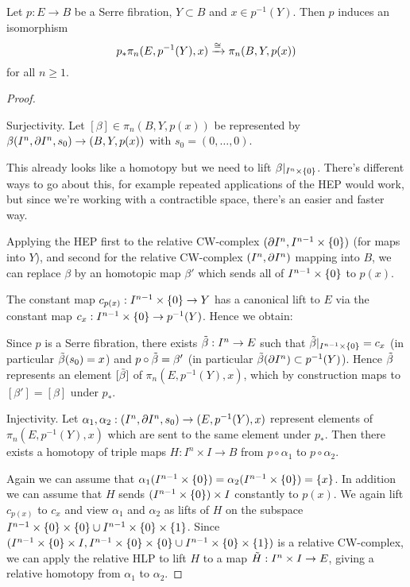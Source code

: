 \begin{proposition}
Let $p:E\to B$ be a Serre fibration, $Y\subset B$ and $x\in p^{-1}(Y)$. Then $p$ induces an isomorphism
\[p_*\pi_n(E,p^{-1}(Y),x)\xrightarrow{\cong}\pi_n(B,Y,p(x))\]
for all $n\geq1$.
\end{proposition}

\begin{proof}\ 

Surjectivity. Let $[\beta]\in\pi_n(B,Y,p(x))$ be represented by $\beta(I^n,\partial I^n,s_0)\to(B,Y,p(x))$ with $s_0=(0,\dots,0)$.\alvaropls{}

This already looks like a homotopy but we need to lift $\beta|_{I^n\times\{0\}}$. There's different ways to go about this, for example repeated applications of the HEP would work, but since we're working with a contractible space, there's an easier and faster way.

Applying the HEP first to the relative CW-complex $(\partial I^n,I^{n-1}\times\{0\})$ (for maps into $Y$), and second for the relative CW-complex $(I^n,\partial I^n)$ mapping into $B$, we can replace $\beta$ by an homotopic map $\beta'$ which sends all of $I^{n-1}\times\{0\}$ to $p(x)$.

The constant map $c_{p(x)}:I^{n-1}\times\{0\}\to Y$ has a canonical lift to $E$ via the constant map $c_x:I^{n-1}\times\{0\}\to p^{-1}(Y)$. Hence we obtain:
\begin{center}
\end{center}
Since $p$ is a Serre fibration, there exists $\tilde\beta:I^n\to E$ such that $\tilde\beta|_{I^{n-1}\times\{0\}}=c_x$ (in particular $\tilde\beta(s_0)=x$) and $p\circ\tilde\beta=\beta'$ (in particular $\tilde\beta(\partial I^n)\subset p^{-1}(Y)$). Hence $\tilde\beta$ represents an element $[\tilde\beta]$ of $\pi_n(E,p^{-1}(Y),x)$, which by construction maps to $[\beta']=[\beta]$ under $p_*$.

Injectivity. Let $\alpha_1,\alpha_2:(I^n,\partial I^n,s_0)\to(E,p^{-1}(Y),x)$ represent elements of $\pi_n(E,p^{-1}(Y),x)$ which are sent to the same element under $p_*$. Then there exists a homotopy of triple maps $H:I^n\times I\to B$ from $p\circ\alpha_1$ to $p\circ\alpha_2$.\alvaropls{}

Again we can assume that $\alpha_1(I^{n-1}\times\{0\})=\alpha_2(I^{n-1}\times\{0\})=\{x\}$. In addition we can assume that $H$ sends $(I^{n-1}\times\{0\})\times I$ constantly to $p(x)$. We again lift $c_{p(x)}$ to $c_x$ and view $\alpha_1$ and $\alpha_2$ as lifts of $H$ on the subspace $I^{n-1}\times\{0\}\times\{0\}\cup I^{n-1}\times\{0\}\times\{1\}$. Since $(I^{n-1}\times\{0\}\times I,I^{n-1}\times\{0\}\times\{0\}\cup I^{n-1}\times\{0\}\times\{1\})$ is a relative CW-complex, we can apply the relative HLP to lift $H$ to a map $\tilde H:I^n\times I\to E$, giving a relative homotopy from $\alpha_1$ to $\alpha_2$.
\end{proof}

